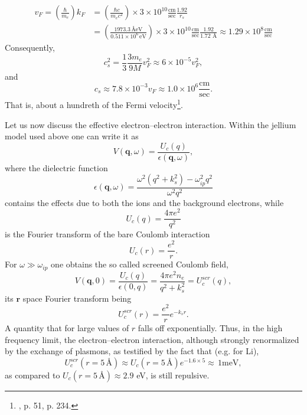 \begin{subappendices}
\begin{align}
\nonumber v_F=\left(\frac{\hbar}{m_e}\right)k_F&
=\left(\frac{\hbar c}{m_e c^2}\right)\times 3\times 10^{10}\frac{\text{cm}}{\text{sec}}\frac{1.92}{r_s}\\
&=\left(\frac{1973.3\,\text{\AA eV}}{0.511\times 10^6\,\text{eV}}\right)\times 3\times 10^{10}\frac{\text{cm}}{\text{sec}}\frac{1.92}{1.72\text{ \AA}}
\approx 1.29\times 10^8 \frac{\text{cm}}{\text{sec}}
\end{align}
Consequently,
\begin{equation}\label{eqC2AppA12}
c_s^2=\frac{1}{3}\frac{3m_e}{9M}v_F^2\approx 6\times 10^{-5}v_F^2,
\end{equation}
and
\begin{equation}\label{eqC2AppA13}
c_s\approx 7.8\times 10^{-3}v_F\approx 1.0\times 10^6 \frac{\text{cm}}{\text{sec}}.
\end{equation}
That is, about a hundreth of the Fermi velocity\footnote{\cite{Ashcroft:87}, p. 51, \cite{Ketterson:99} p. 234.}.



Let us now discuss the effective electron--electron interaction. Within the jellium model used above one can write it as
\begin{equation}\label{eqC2AppA14}
V(\mathbf q,\omega)=\frac{U_c(q)}{\epsilon(\mathbf q,\omega)},
\end{equation}
where the dielectric function
\begin{equation}\label{eqC2AppA15}
\epsilon(\mathbf q,\omega)=\frac{\omega^2(q^2+k_s^2)-\omega^2_{ip}q^2}{\omega^2q^2}
\end{equation}
contains the effects due to both the ions and the background electrons, while
\begin{equation}\label{eqC2AppA16}
U_c(q)=\frac{4\pi e^2}{q^2}
\end{equation}
is the Fourier transform of the bare Coulomb interaction
\begin{equation}\label{eqC2AppA17}
U_c(r)=\frac{e^2}{r}.
\end{equation}
For $\omega\gg \omega_{ip}$ one obtains the so called screened Coulomb field,
\begin{equation}\label{eqC2AppA18}
V(\mathbf q,0)=\frac{U_c(q)}{\epsilon(0,q)}=\frac{4\pi e^2 n_e}{q^2+k_s^2}=U_c^{scr}(q),
\end{equation}
its $\mathbf r$ space Fourier transform being 
\begin{equation}\label{eqC2AppA19}
U_c^{scr}(r)=\frac{e^2}{r}e^{-k_s r}.
\end{equation}
A quantity that for large values of $r$ falls off exponentially. Thus, in the high frequency limit, the electron--electron interaction, although strongly renormalized by the exchange of plasmons, as testified by the fact that (e.g. for Li),
\begin{equation}\label{eqC2AppA20}
U_c^{scr}(r=5\,\text{\AA})\approx U_c(r=5\,\text{\AA})e^{-1.6\times 5}\approx \,1\text{meV},
\end{equation}
as compared to $U_c(r=5\,\text{\AA})\approx 2.9$ eV, is still repulsive.



\end{subappendices}
